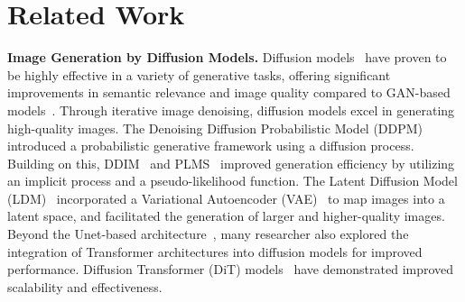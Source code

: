 \section{Related Work}
\noindent\textbf{Image Generation by Diffusion Models.}
Diffusion models~\cite{rombach2022high, ho2020denoising} have proven to be highly effective in a variety of generative tasks, offering significant improvements in semantic relevance and image quality compared to GAN-based models~\cite{goodfellow2020generative}. Through iterative image denoising, diffusion models excel in generating high-quality images.
The Denoising Diffusion Probabilistic Model (DDPM)~\cite{ho2020denoising} introduced a probabilistic generative framework using a diffusion process. Building on this, DDIM~\cite{song2020denoising} and PLMS~\cite{liu2022pseudo} improved generation efficiency by utilizing an implicit process and a pseudo-likelihood function.
%
The Latent Diffusion Model (LDM)~\cite{rombach2022high} incorporated a Variational Autoencoder (VAE)~\cite{kingma2013auto} to map images into a latent space, and facilitated the generation of larger and higher-quality images.
Beyond the Unet-based architecture~\cite{ronneberger2015u}, many researcher also explored the integration of Transformer architectures into diffusion models for improved performance. Diffusion Transformer (DiT) models~\cite{chen2024pixartalpha, bao2023all, zhang2023adding, peebles2023scalable, chen2024pixart} have demonstrated improved scalability and effectiveness.


